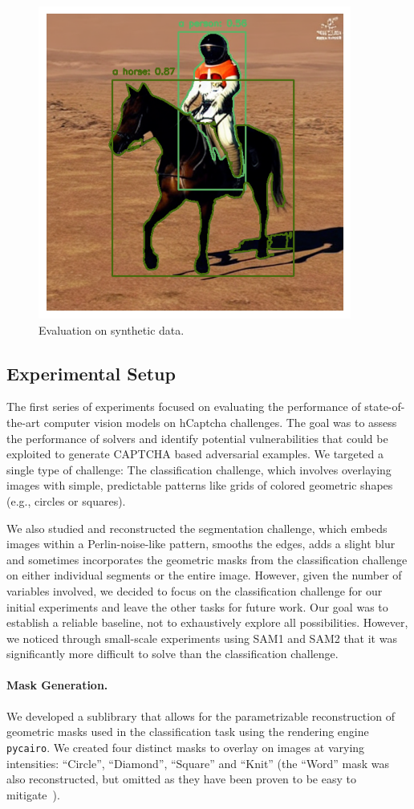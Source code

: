 \documentclass[a4paper, oneside]{discothesis}
\begin{document}
\begin{figure}
	\centering
	\includegraphics[width=0.3\columnwidth]{figures/chained.png}
	\caption{Evaluation on synthetic data.}
	\label{fig:chained}
\end{figure}

\subsection{Experimental Setup}

The first series of experiments focused on evaluating the performance of state-of-the-art computer vision models on hCaptcha challenges. The goal was to assess the performance of solvers and identify potential vulnerabilities that could be exploited to generate CAPTCHA based adversarial examples. We targeted a single type of challenge: The classification challenge, which involves overlaying images with simple, predictable patterns like grids of colored geometric shapes (e.g., circles or squares).

We also studied and reconstructed the segmentation challenge, which embeds images within a Perlin-noise-like pattern, smooths the edges, adds a slight blur and sometimes incorporates the geometric masks from the classification challenge on either individual segments or the entire image. However, given the number of variables involved, we decided to focus on the classification challenge for our initial experiments and leave the other tasks for future work. Our goal was to establish a reliable baseline, not to exhaustively explore all possibilities. However, we noticed through small-scale experiments using SAM1 and SAM2 that it was significantly more difficult to solve than the classification challenge.

\paragraph{Mask Generation.}

We developed a sublibrary that allows for the parametrizable reconstruction of geometric masks used in the classification task using the rendering engine \texttt{pycairo}. We created four distinct masks to overlay on images at varying intensities: ``Circle'', ``Diamond'', ``Square'' and ``Knit'' (the ``Word'' mask was also reconstructed, but omitted as they have been proven to be easy to mitigate~\cite{zhang2023text,dong2023robust,shayegani2023plug}).
\end{document}
